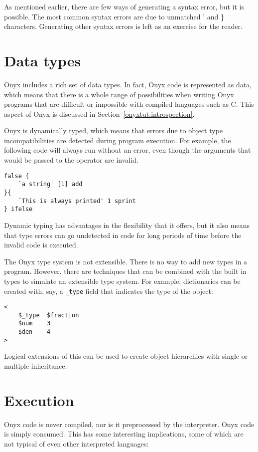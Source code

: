 As mentioned earlier, there are few ways of generating a syntax error, but it is
possible.  The most common syntax errors are due to unmatched ' and \}
characters.  Generating other syntax errors is left as an exercise for the
reader.

\section{Data types}

Onyx includes a rich set of data types.  In fact, Onyx code is represented as
data, which means that there is a whole range of possibilities when writing Onyx
programs that are difficult or impossible with compiled languages such as C.
This aspect of Onyx is discussed in Section~\ref{onyxtut:introspection}.

Onyx is dynamically typed, which means that errors due to object type
incompatibilities are detected during program execution.  For example, the
following code will always run without an error, even though the arguments that
would be passed to the  operator are
invalid.

\begin{verbatim}
false {
    `a string' [1] add
}{
    `This is always printed' 1 sprint
} ifelse
\end{verbatim}

Dynamic typing has advantages in the flexibility that it offers, but it also
means that type errors can go undetected in code for long periods of time before
the invalid code is executed.

The Onyx type system is not extensible.  There is no way to add new types in a
program.  However, there are techniques that can be combined with the built in
types to simulate an extensible type system.  For example, dictionaries can be
created with, say, a {\tt \_type} field that indicates the type of the object:

\begin{verbatim}
<
    $_type  $fraction
    $num    3
    $den    4
>
\end{verbatim}

Logical extensions of this can be used to create object hierarchies with single
or multiple inheritance.

\section{Execution}

Onyx code is never compiled, nor is it preprocessed by the interpreter.  Onyx
code is simply consumed.  This has some interesting implications, some of which
are not typical of even other interpreted languages:


